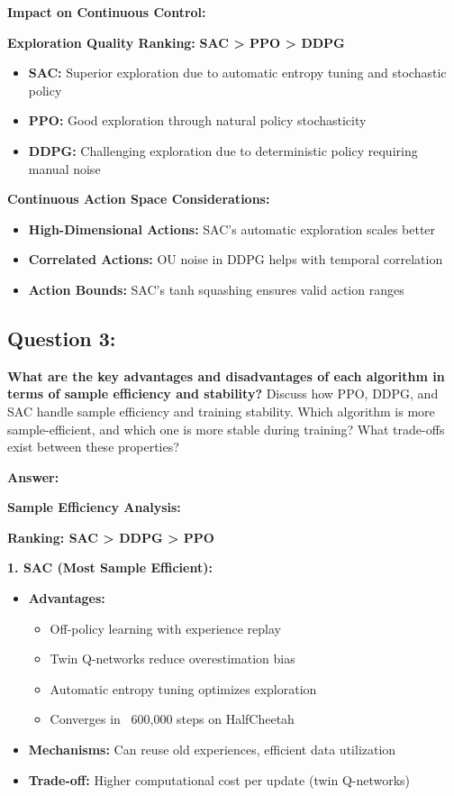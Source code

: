 \documentclass[12pt]{article}
\begin{document}
{{{\textbf{Impact on Continuous Control:}

\textbf{Exploration Quality Ranking:} \textbf{SAC > PPO > DDPG}

\begin{itemize}
    \item \textbf{SAC:} Superior exploration due to automatic entropy tuning and stochastic policy
    \item \textbf{PPO:} Good exploration through natural policy stochasticity
    \item \textbf{DDPG:} Challenging exploration due to deterministic policy requiring manual noise
\end{itemize}

\textbf{Continuous Action Space Considerations:}
\begin{itemize}
    \item \textbf{High-Dimensional Actions:} SAC's automatic exploration scales better
    \item \textbf{Correlated Actions:} OU noise in DDPG helps with temporal correlation
    \item \textbf{Action Bounds:} SAC's tanh squashing ensures valid action ranges
\end{itemize}

\subsection{Question 3:}
\textbf{What are the key advantages and disadvantages of each algorithm in terms of sample efficiency and stability?}
\newline
Discuss how PPO, DDPG, and SAC handle sample efficiency and training stability. Which algorithm is more sample-efficient, and which one is more stable during training? What trade-offs exist between these properties?

\textbf{Answer:}

\textbf{Sample Efficiency Analysis:}

\textbf{Ranking: SAC > DDPG > PPO}

\textbf{1. SAC (Most Sample Efficient):}
\begin{itemize}
    \item \textbf{Advantages:}
    \begin{itemize}
        \item Off-policy learning with experience replay
        \item Twin Q-networks reduce overestimation bias
        \item Automatic entropy tuning optimizes exploration
        \item Converges in ~600,000 steps on HalfCheetah
    \end{itemize}
    \item \textbf{Mechanisms:} Can reuse old experiences, efficient data utilization
    \item \textbf{Trade-off:} Higher computational cost per update (twin Q-networks)
\end{itemize}

}}}
\end{document}
